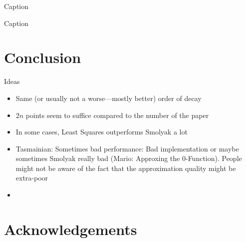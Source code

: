 \documentclass[12pt, oneside]{amsart}
\theoremstyle{definition}
\theoremstyle{remark}
\numberwithin{equation}{section}
\begin{document}
\begin{table}[H]
	\centering
	\begin{adjustbox}{width=\linewidth}
		
	\end{adjustbox}
	\caption{Caption}
	\label{tab:dim2_results}
\end{table}

\begin{table}[H]
	\centering
	\begin{adjustbox}{width=\linewidth}
		
	\end{adjustbox}
	\caption{Caption}
	\label{tab:scale3_results}
\end{table}

\section{Conclusion}\label{sec:conclusion}

Ideas
\begin{itemize}
	\item Same (or usually not a worse---mostly better) order of decay
	\item $2n$ points seem to suffice compared to the number of the paper
	\item In some cases, Least Squares outperforms Smolyak a lot
	\item Tasmainian: Sometimes bad performance: Bad implementation or maybe 
	sometimes Smolyak really bad (Mario: Approxing the $0$-Function). People 
	might not be aware of the fact that the approximation quality might be 
	extra-poor
	\item 
\end{itemize}


\section*{Acknowledgements}




\newpage

\nocite{*}
\printbibliography

\bigskip

\noindent
\address{J.E., Johannes Kepler University Linz; 
\texttt{jakob.eggl@jku.at}; \\
	E.M., Johannes Kepler University Linz; 
	\texttt{elias.mindlberger@jku.at}; \\
	M.U., Johannes Kepler University Linz; 
	\texttt{mario.ullrich@jku.at}
}
\end{document}

